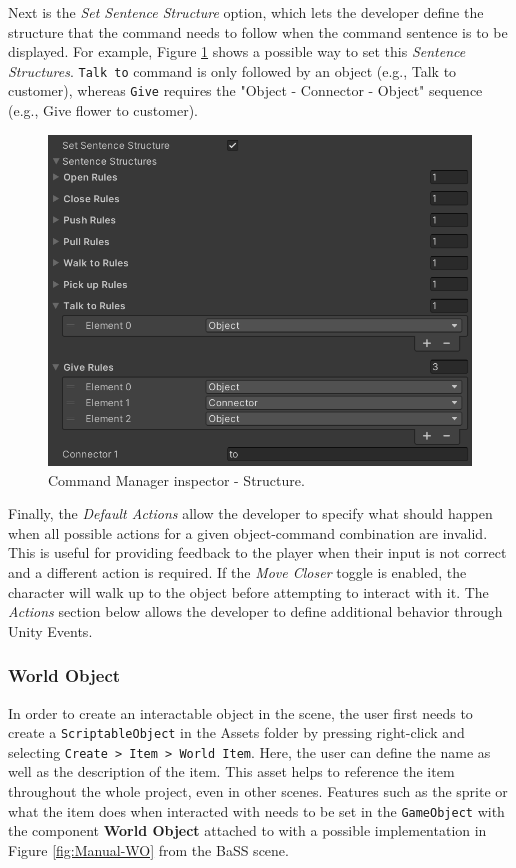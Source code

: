 Next is the \textit{Set Sentence Structure} option, which lets the developer define the structure that the command needs to follow when the command sentence is to be displayed. For example, Figure \ref{fig:Manual-CM3} shows a possible way to set this \textit{Sentence Structures}. \verb|Talk to| command is only followed by an object (e.g., Talk to customer), whereas \verb|Give| requires the "Object - Connector - Object" sequence (e.g., Give flower to customer).

\begin{figure}[H]
\centering
\includegraphics[width=.8\linewidth]{img/User doc/image_2025-07-04_203654317.png}
\caption{Command Manager inspector - Structure.}
\label{fig:Manual-CM3}
\end{figure}

Finally, the \textit{Default Actions} allow the developer to specify what should happen when all possible actions for a given object-command combination are invalid. This is useful for providing feedback to the player when their input is not correct and a different action is required. If the \textit{Move Closer} toggle is enabled, the character will walk up to the object before attempting to interact with it. The \textit{Actions} section below allows the developer to define additional behavior through Unity Events.

\subsubsection{World Object}
In order to create an interactable object in the scene, the user first needs to create a \verb|ScriptableObject| in the Assets folder by pressing right-click and selecting \verb|Create > Item > World Item|. Here, the user can define the name as well as the description of the item. This asset helps to reference the item throughout the whole project, even in other scenes. Features such as the sprite or what the item does when interacted with needs to be set in the \verb|GameObject| with the component \textbf{World Object} attached to with a possible implementation in Figure \ref{fig:Manual-WO} from the BaSS scene. 

